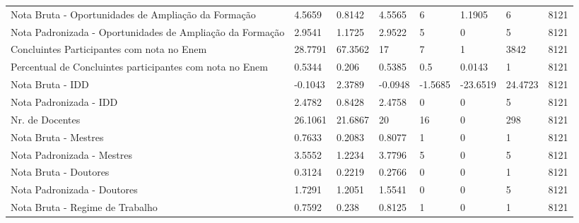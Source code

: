 \begin{table}[H]
{\begin{tabular}{@{}llllllll@{}}
Nota Bruta - Oportunidades de Ampliação da Formação       & 4.5659         & 0.8142                 & 4.5565           & 6             & 1.1905          & 6               & 8121       \\
Nota Padronizada - Oportunidades de Ampliação da Formação & 2.9541         & 1.1725                 & 2.9522           & 5             & 0               & 5               & 8121       \\
Concluintes Participantes com nota no Enem                & 28.7791        & 67.3562                & 17               & 7             & 1               & 3842            & 8121       \\
Percentual de Concluintes participantes com nota no Enem  & 0.5344         & 0.206                  & 0.5385           & 0.5           & 0.0143          & 1               & 8121       \\
Nota Bruta - IDD                                          & -0.1043        & 2.3789                 & -0.0948          & -1.5685       & -23.6519        & 24.4723         & 8121       \\
Nota Padronizada - IDD                                    & 2.4782         & 0.8428                 & 2.4758           & 0             & 0               & 5               & 8121       \\
Nr. de Docentes                                           & 26.1061        & 21.6867                & 20               & 16            & 0               & 298             & 8121       \\
Nota Bruta - Mestres                                      & 0.7633         & 0.2083                 & 0.8077           & 1             & 0               & 1               & 8121       \\
Nota Padronizada - Mestres                                & 3.5552         & 1.2234                 & 3.7796           & 5             & 0               & 5               & 8121       \\
Nota Bruta - Doutores                                     & 0.3124         & 0.2219                 & 0.2766           & 0             & 0               & 1               & 8121       \\
Nota Padronizada - Doutores                               & 1.7291         & 1.2051                 & 1.5541           & 0             & 0               & 5               & 8121       \\
Nota Bruta - Regime de Trabalho                           & 0.7592         & 0.238                  & 0.8125           & 1             & 0               & 1               & 8121       \\

\end{tabular}}
\end{table}
